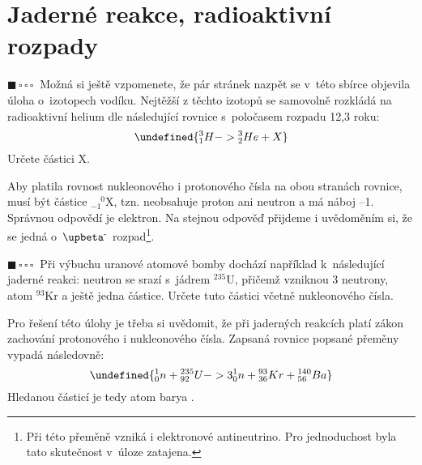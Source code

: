 \documentclass{book}
\let\ch\undefined
\newcommand{\jeden}{$\blacksquare \, \square \, \square \, \square \; \; $}
\renewenvironment{quotation}{\par}{\par} %
\begin{document}
\section{Jaderné reakce, radioaktivní rozpady}

\begin{quotation}
\jeden Možná si ještě vzpomenete, že pár stránek nazpět se v~této sbírce objevila úloha o~izotopech vodíku. Nejtěžší
z těchto izotopů se samovolně rozkládá na radioaktivní helium dle následující
rovnice s~poločasem rozpadu 12,3 roku:
\shorthandoff{-}
\begin{equation*}
\ch{{^{3}_{1}H} -> {^{3}_{2}He} + X}
\end{equation*}
\shorthandon{-}
Určete částici X.
\end{quotation} \dotfill \par 
Aby platila rovnost nukleonového i protonového čísla na obou stranách
rovnice, musí být částice $_{-1}^{\phantom{-}0}$X, tzn. neobsahuje
proton ani neutron a má náboj --1. Správnou odpovědí je elektron.
Na stejnou odpověď přijdeme i uvědoměním si, že se jedná o~$\upbeta\textsuperscript{{-}}$ rozpad\footnote{Při této přeměně vzniká i elektronové antineutrino. Pro jednoduchost byla tato skutečnost v~úloze zatajena.}.

\hrulefill %
\begin{quotation}
\jeden Při výbuchu uranové atomové bomby dochází například k~následující
jaderné reakci: neutron se srazí s~jádrem $^{235}$U, přičemž vzniknou
3 neutrony, atom $^{93}$Kr a ještě jedna částice. Určete tuto částici
včetně nukleonového čísla.
\end{quotation} \dotfill \par 
Pro řešení této úlohy je třeba si uvědomit, že při jaderných reakcích
platí zákon zachování protonového i nukleonového čísla. Zapsaná rovnice
popsané přeměny vypadá následovně:
\shorthandoff{-}
\begin{equation*}
\ch{{^{1}_{0}n} + {^{235}_{92}U} -> 3 {^{1}_{0}n} + {^{93}_{36}Kr} + {^{140}_{56}Ba}}
\end{equation*}
\shorthandon{-}
Hledanou částicí je tedy atom barya \ch{^{140}_{56}Ba}.
\newpage %
\end{document}
